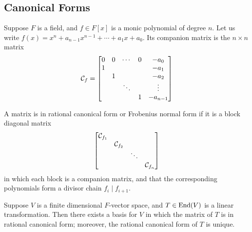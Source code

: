 \subsection*{Canonical Forms}

\begin{definition}
    Suppose \(F\) is a field, and \(f \in F[x]\) is a monic polynomial of degree \(n\).
    Let us write \(f(x) = x^n + a_{n-1}x^{n-1} + \cdots + a_1x + a_0\).
    Its companion matrix is the \(n \times n\) matrix
    \begin{equation*}
        \mathcal{C}_f =
        \begin{bmatrix}
            0 & 0 & \cdots & 0 & -a_0 \\
            1 & & & & -a_1 \\
            & 1 & & & -a_2 \\
            & & \ddots & & \vdots \\
            & & & 1 & -a_{n-1}
        \end{bmatrix}
    \end{equation*}
\end{definition}
\begin{definition}
    A matrix is in rational canonical form or Frobenius normal form
    if it is a block diagonal matrix
    \begin{equation*}
        \begin{bmatrix}
            \mathcal{C}_{f_1} \\
            & \mathcal{C}_{f_2} \\
            & & \ddots \\
            & & & \mathcal{C}_{f_n}
        \end{bmatrix}
    \end{equation*}
    in which each block is a companion matrix,
    and that the corresponding polynomials form a divisor chain \(f_i \mid f_{i+1}\).
\end{definition}
\begin{theorem}\label{thm:rational-canonical-form}
    Suppose \(V\) is a finite dimensional \(F\)-vector space,
    and \(T \in \operatorname{End}(V)\) is a linear transformation.
    Then there exists a basis for \(V\) in which
    the matrix of \(T\) is in rational canonical form;
    moreover, the rational canonical form of \(T\) is unique.
\end{theorem}
